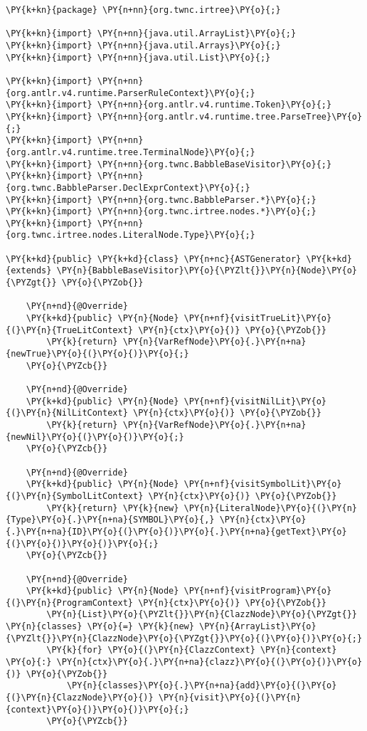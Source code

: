 \begin{Verbatim}[commandchars=\\\{\}]
\PY{k+kn}{package} \PY{n+nn}{org.twnc.irtree}\PY{o}{;}

\PY{k+kn}{import} \PY{n+nn}{java.util.ArrayList}\PY{o}{;}
\PY{k+kn}{import} \PY{n+nn}{java.util.Arrays}\PY{o}{;}
\PY{k+kn}{import} \PY{n+nn}{java.util.List}\PY{o}{;}

\PY{k+kn}{import} \PY{n+nn}{org.antlr.v4.runtime.ParserRuleContext}\PY{o}{;}
\PY{k+kn}{import} \PY{n+nn}{org.antlr.v4.runtime.Token}\PY{o}{;}
\PY{k+kn}{import} \PY{n+nn}{org.antlr.v4.runtime.tree.ParseTree}\PY{o}{;}
\PY{k+kn}{import} \PY{n+nn}{org.antlr.v4.runtime.tree.TerminalNode}\PY{o}{;}
\PY{k+kn}{import} \PY{n+nn}{org.twnc.BabbleBaseVisitor}\PY{o}{;}
\PY{k+kn}{import} \PY{n+nn}{org.twnc.BabbleParser.DeclExprContext}\PY{o}{;}
\PY{k+kn}{import} \PY{n+nn}{org.twnc.BabbleParser.*}\PY{o}{;}
\PY{k+kn}{import} \PY{n+nn}{org.twnc.irtree.nodes.*}\PY{o}{;}
\PY{k+kn}{import} \PY{n+nn}{org.twnc.irtree.nodes.LiteralNode.Type}\PY{o}{;}

\PY{k+kd}{public} \PY{k+kd}{class} \PY{n+nc}{ASTGenerator} \PY{k+kd}{extends} \PY{n}{BabbleBaseVisitor}\PY{o}{\PYZlt{}}\PY{n}{Node}\PY{o}{\PYZgt{}} \PY{o}{\PYZob{}}

    \PY{n+nd}{@Override}
    \PY{k+kd}{public} \PY{n}{Node} \PY{n+nf}{visitTrueLit}\PY{o}{(}\PY{n}{TrueLitContext} \PY{n}{ctx}\PY{o}{)} \PY{o}{\PYZob{}}
        \PY{k}{return} \PY{n}{VarRefNode}\PY{o}{.}\PY{n+na}{newTrue}\PY{o}{(}\PY{o}{)}\PY{o}{;}
    \PY{o}{\PYZcb{}}

    \PY{n+nd}{@Override}
    \PY{k+kd}{public} \PY{n}{Node} \PY{n+nf}{visitNilLit}\PY{o}{(}\PY{n}{NilLitContext} \PY{n}{ctx}\PY{o}{)} \PY{o}{\PYZob{}}
        \PY{k}{return} \PY{n}{VarRefNode}\PY{o}{.}\PY{n+na}{newNil}\PY{o}{(}\PY{o}{)}\PY{o}{;}
    \PY{o}{\PYZcb{}}

    \PY{n+nd}{@Override}
    \PY{k+kd}{public} \PY{n}{Node} \PY{n+nf}{visitSymbolLit}\PY{o}{(}\PY{n}{SymbolLitContext} \PY{n}{ctx}\PY{o}{)} \PY{o}{\PYZob{}}
        \PY{k}{return} \PY{k}{new} \PY{n}{LiteralNode}\PY{o}{(}\PY{n}{Type}\PY{o}{.}\PY{n+na}{SYMBOL}\PY{o}{,} \PY{n}{ctx}\PY{o}{.}\PY{n+na}{ID}\PY{o}{(}\PY{o}{)}\PY{o}{.}\PY{n+na}{getText}\PY{o}{(}\PY{o}{)}\PY{o}{)}\PY{o}{;}
    \PY{o}{\PYZcb{}}

    \PY{n+nd}{@Override}
    \PY{k+kd}{public} \PY{n}{Node} \PY{n+nf}{visitProgram}\PY{o}{(}\PY{n}{ProgramContext} \PY{n}{ctx}\PY{o}{)} \PY{o}{\PYZob{}}
        \PY{n}{List}\PY{o}{\PYZlt{}}\PY{n}{ClazzNode}\PY{o}{\PYZgt{}} \PY{n}{classes} \PY{o}{=} \PY{k}{new} \PY{n}{ArrayList}\PY{o}{\PYZlt{}}\PY{n}{ClazzNode}\PY{o}{\PYZgt{}}\PY{o}{(}\PY{o}{)}\PY{o}{;}
        \PY{k}{for} \PY{o}{(}\PY{n}{ClazzContext} \PY{n}{context} \PY{o}{:} \PY{n}{ctx}\PY{o}{.}\PY{n+na}{clazz}\PY{o}{(}\PY{o}{)}\PY{o}{)} \PY{o}{\PYZob{}}
            \PY{n}{classes}\PY{o}{.}\PY{n+na}{add}\PY{o}{(}\PY{o}{(}\PY{n}{ClazzNode}\PY{o}{)} \PY{n}{visit}\PY{o}{(}\PY{n}{context}\PY{o}{)}\PY{o}{)}\PY{o}{;}
        \PY{o}{\PYZcb{}}


\end{Verbatim}
